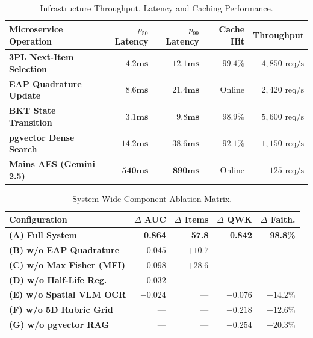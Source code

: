 \documentclass[conference]{IEEEtran}
\begin{document}
\begin{table}[h]
\centering
\caption{Infrastructure Throughput, Latency and Caching Performance.}
\label{tab:latency_benchmarks}
\small
\begin{tabularx}{\columnwidth}{lrrrr}
\toprule
\textbf{Microservice Operation} & \textbf{$p_{50}$ Latency} & \textbf{$p_{99}$ Latency} & \textbf{Cache Hit} & \textbf{Throughput} \\
\midrule
\textbf{3PL Next-Item Selection} & $\mathbf{4.2\text{ms}}$ & $\mathbf{12.1\text{ms}}$ & $99.4\%$ & $4,850\text{ req/s}$ \\
\textbf{EAP Quadrature Update} & $\mathbf{8.6\text{ms}}$ & $\mathbf{21.4\text{ms}}$ & Online & $2,420\text{ req/s}$ \\
\textbf{BKT State Transition} & $\mathbf{3.1\text{ms}}$ & $\mathbf{9.8\text{ms}}$ & $98.9\%$ & $5,600\text{ req/s}$ \\
\textbf{pgvector Dense Search} & $\mathbf{14.2\text{ms}}$ & $\mathbf{38.6\text{ms}}$ & $92.1\%$ & $1,150\text{ req/s}$ \\
\textbf{Mains AES (Gemini 2.5)} & $\mathbf{540\text{ms}}$ & $\mathbf{890\text{ms}}$ & Online & $125\text{ req/s}$ \\
\bottomrule
\end{tabularx}
\end{table}

\begin{table}[h]
\centering
\caption{System-Wide Component Ablation Matrix.}
\label{tab:ablation_matrix}
\small
\begin{tabularx}{\columnwidth}{lrrrr}
\toprule
\textbf{Configuration} & \textbf{$\Delta$ AUC} & \textbf{$\Delta$ Items} & \textbf{$\Delta$ QWK} & \textbf{$\Delta$ Faith.} \\
\midrule
\textbf{(A) Full System} & \textbf{0.864} & \textbf{57.8} & \textbf{0.842} & \textbf{98.8\%} \\
\textbf{(B) w/o EAP Quadrature} & $-0.045$ & $+10.7$ & --- & --- \\
\textbf{(C) w/o Max Fisher (MFI)} & $-0.098$ & $+28.6$ & --- & --- \\
\textbf{(D) w/o Half-Life Reg.} & $-0.032$ & --- & --- & --- \\
\textbf{(E) w/o Spatial VLM OCR} & $-0.024$ & --- & $-0.076$ & $-14.2\%$ \\
\textbf{(F) w/o 5D Rubric Grid} & --- & --- & $-0.218$ & $-12.6\%$ \\
\textbf{(G) w/o pgvector RAG} & --- & --- & $-0.254$ & $-20.3\%$ \\
\bottomrule
\end{tabularx}
\end{table}
\end{document}
